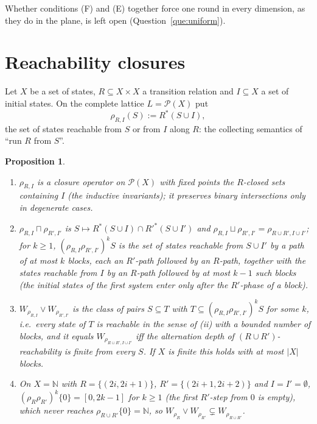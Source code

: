 \documentclass[11pt]{amsart}
\newtheorem{prop}[thm]{Proposition}
\theoremstyle{definition}
\newcommand{\cP}{\mathcal P}
\begin{document}
Whether conditions (F) and (E) together force one round in every
dimension, as they do in the plane, is left open
(Question~\ref{que:uniform}).


\section{Reachability closures}\label{sec:reach}

Let $X$ be a set of states, $R\subseteq X\times X$ a transition relation
and $I\subseteq X$ a set of initial states. On the complete lattice
$L=\cP(X)$ put
\[
\rho_{R,I}(S):=R^*(S\cup I),
\]
the set of states reachable from $S$ or from $I$ along $R$: the collecting
semantics of ``run $R$ from $S$''.

\begin{prop}\label{prop:reach}
\begin{enumerate}
\item[(i)] $\rho_{R,I}$ is a closure operator on $\cP(X)$ with fixed points
the $R$-closed sets containing $I$ (the inductive invariants); it
preserves binary intersections only in degenerate cases.
\item[(ii)] $\rho_{R,I}\sqcap\rho_{R',I'}$ is $S\mapsto R^*(S\cup I)\cap
R'^*(S\cup I')$ and $\rho_{R,I}\sqcup\rho_{R',I'}=\rho_{R\cup R',I\cup
I'}$; for $k\ge1$, $(\rho_{R,I}\rho_{R',I'})^kS$ is the set of states
reachable from $S\cup I'$ by a path of at most $k$ blocks, each an
$R'$-path followed by an $R$-path, together with the states reachable from
$I$ by an $R$-path followed by at most $k-1$ such blocks (the initial
states of the first system enter only after the $R'$-phase of a block).
\item[(iii)] $W_{\rho_{R,I}}\vee W_{\rho_{R',I'}}$ is the class of pairs
$S\subseteq T$ with $T\subseteq(\rho_{R,I}\rho_{R',I'})^kS$ for some $k$,
i.e.\ every state of $T$ is reachable in the sense of (ii) with a bounded
number of blocks, and it equals
$W_{\rho_{R\cup R',I\cup I'}}$ iff the alternation depth of $(R\cup
R')$-reachability is finite from every $S$. If $X$ is finite this holds
with at most $|X|$ blocks.
\item[(iv)] On $X=\mathbb N$ with $R=\{(2i,2i+1)\}$, $R'=\{(2i+1,2i+2)\}$
and $I=I'=\emptyset$, $(\rho_R\rho_{R'})^k\{0\}=[0,2k-1]$ for $k\ge1$
(the first $R'$-step from $0$ is empty), which never reaches
$\rho_{R\cup R'}\{0\}=\mathbb N$, so $W_{\rho_R}\vee W_{\rho_{R'}}\subsetneq
W_{\rho_{R\cup R'}}$.
\end{enumerate}
\end{prop}
\end{document}
